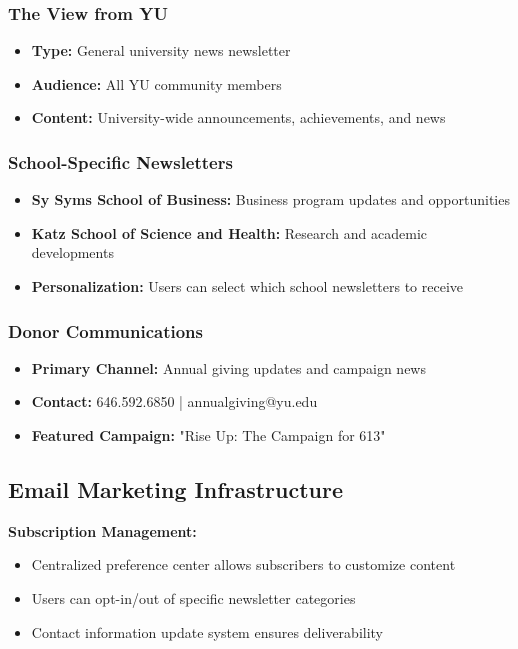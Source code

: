 \documentclass[12pt,letterpaper]{article}
\begin{document}
\subsubsection{The View from YU}
\begin{itemize}[leftmargin=*]
    \item \textbf{Type:} General university news newsletter
    \item \textbf{Audience:} All YU community members
    \item \textbf{Content:} University-wide announcements, achievements, and news
\end{itemize}

\subsubsection{School-Specific Newsletters}
\begin{itemize}[leftmargin=*]
    \item \textbf{Sy Syms School of Business:} Business program updates and opportunities
    \item \textbf{Katz School of Science and Health:} Research and academic developments
    \item \textbf{Personalization:} Users can select which school newsletters to receive
\end{itemize}

\subsubsection{Donor Communications}
\begin{itemize}[leftmargin=*]
    \item \textbf{Primary Channel:} Annual giving updates and campaign news
    \item \textbf{Contact:} 646.592.6850 | annualgiving@yu.edu
    \item \textbf{Featured Campaign:} "Rise Up: The Campaign for 613"
\end{itemize}

\subsection{Email Marketing Infrastructure}

\textbf{Subscription Management:}
\begin{itemize}[leftmargin=*]
    \item Centralized preference center allows subscribers to customize content
    \item Users can opt-in/out of specific newsletter categories
    \item Contact information update system ensures deliverability
\end{itemize}
\end{document}
